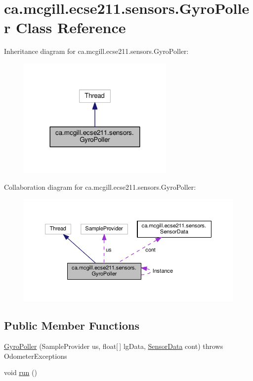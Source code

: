 \hypertarget{classca_1_1mcgill_1_1ecse211_1_1sensors_1_1_gyro_poller}{}\section{ca.\+mcgill.\+ecse211.\+sensors.\+Gyro\+Poller Class Reference}
\label{classca_1_1mcgill_1_1ecse211_1_1sensors_1_1_gyro_poller}


Inheritance diagram for ca.\+mcgill.\+ecse211.\+sensors.\+Gyro\+Poller\+:\nopagebreak
\begin{figure}[H]
\begin{center}
\leavevmode
\includegraphics[width=216pt]{classca_1_1mcgill_1_1ecse211_1_1sensors_1_1_gyro_poller__inherit__graph}
\end{center}
\end{figure}


Collaboration diagram for ca.\+mcgill.\+ecse211.\+sensors.\+Gyro\+Poller\+:\nopagebreak
\begin{figure}[H]
\begin{center}
\leavevmode
\includegraphics[width=350pt]{classca_1_1mcgill_1_1ecse211_1_1sensors_1_1_gyro_poller__coll__graph}
\end{center}
\end{figure}
\subsection*{Public Member Functions}
\begin{DoxyCompactItemize}
\item 
\hyperlink{classca_1_1mcgill_1_1ecse211_1_1sensors_1_1_gyro_poller_a284eec4434708068ce9cb8a9635f7830}{Gyro\+Poller} (Sample\+Provider us, float\mbox{[}$\,$\mbox{]} lg\+Data, \hyperlink{classca_1_1mcgill_1_1ecse211_1_1sensors_1_1_sensor_data}{Sensor\+Data} cont)  throws Odometer\+Exceptions 
\item 
void \hyperlink{classca_1_1mcgill_1_1ecse211_1_1sensors_1_1_gyro_poller_a2a52059192555ece72190fa44a761d28}{run} ()
\end{DoxyCompactItemize}
